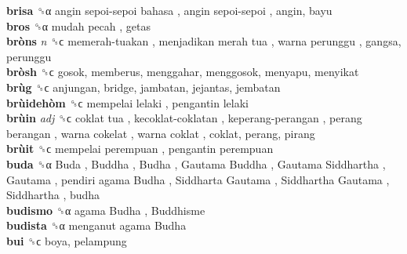 \textbf{brisa} ␝α   angin sepoi-sepoi bahasa ,  angin sepoi-sepoi , angin, bayu  \\
\textbf{bros} ␝α   mudah pecah , getas  \\
\textbf{bròns} \emph{n}  ␝ϲ   memerah-tuakan ,  menjadikan merah tua ,  warna perunggu , gangsa, perunggu  \\
\textbf{bròsh} ␝ϲ  gosok, memberus, menggahar, menggosok, menyapu, menyikat  \\
\textbf{brùg} ␝ϲ  anjungan, bridge, jambatan, jejantas, jembatan  \\
\textbf{brùidehòm} ␝ϲ   mempelai lelaki ,  pengantin lelaki   \\
\textbf{brùin} \emph{adj}  ␝ϲ   coklat tua ,  kecoklat-coklatan ,  keperang-perangan ,  perang berangan ,  warna cokelat ,  warna coklat , coklat, perang, pirang  \\
\textbf{brùit} ␝ϲ   mempelai perempuan ,  pengantin perempuan   \\
\textbf{buda} ␝α   Buda ,  Buddha ,  Budha ,  Gautama Buddha ,  Gautama Siddhartha ,  Gautama ,  pendiri agama Budha ,  Siddharta Gautama ,  Siddhartha Gautama ,  Siddhartha , budha  \\
\textbf{budismo} ␝α   agama Budha ,  Buddhisme   \\
\textbf{budista} ␝α   menganut agama Budha   \\
\textbf{bui} ␝ϲ  boya, pelampung  \\
